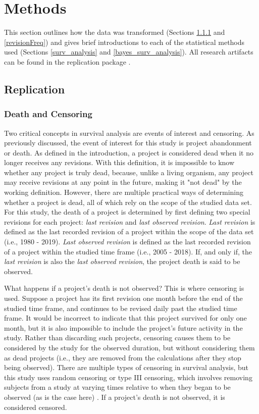 \documentclass[sigconf,review]{acmart}
\begin{document}
\section{Methods} \label{methods}

This section outlines how the data was transformed (Sections \ref{death_censoring} and \ref{revisionFreq}) and gives brief introductions to each of the statistical methods used (Sections \ref{surv_analysis} and \ref{bayes_surv_analysis}). 
All research artifacts can be found in the replication package \cite{repl-package}.

\subsection{Replication} \label{replmethods}
\subsubsection{Death and Censoring} \label{death_censoring}

Two critical concepts in survival analysis are events of interest and censoring.
As previously discussed, the event of interest for this study is project abandonment or death.
As defined in the introduction, a project is considered dead when it no longer receives any revisions.
With this definition, it is impossible to know whether any project is truly dead, because, unlike a living organism, any project may receive revisions at any point in the future, making it "not dead" by the working definition.
However, there are multiple practical ways of determining whether a project is dead, all of which rely on the scope of the studied data set.
For this study, the death of a project is determined by first defining two special revisions for each project: \emph{last revision} and \emph{last observed revision}. 
\emph{Last revision} is defined as the last recorded revision of a project within the scope of the data set (i.e., 1980 - 2019). 
\emph{Last observed revision} is defined as the last recorded revision of a project within the studied time frame (i.e., 2005 - 2018). 
If, and only if, the \emph{last revision} is also the \emph{last observed revision}, the project death is said to be observed. 

What happens if a project's death is not observed?
This is where censoring is used.
Suppose a project has its first revision one month before the end of the studied time frame, and continues to be revised daily past the studied time frame.
It would be incorrect to indicate that this project survived for only one month, but it is also impossible to include the project's future activity in the study.
Rather than discarding such projects, censoring causes them to be considered by the study for the observed duration, but without considering them as dead projects (i.e., they are removed from the calculations after they stop being observed).
There are multiple types of censoring in survival analysis, but this study uses random censoring or type III censoring, which involves removing subjects from a study at varying times relative to when they began to be observed (as is the case here) \cite{renganathan2016overview}. If a project's death is not observed, it is considered censored.
\end{document}
